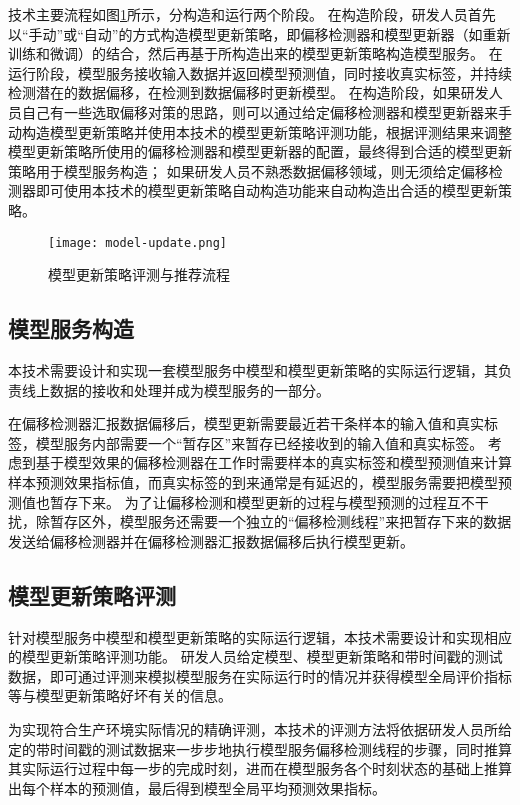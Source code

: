 技术主要流程如图\ref{fig:modelupdate}所示，分构造和运行两个阶段。
在构造阶段，研发人员首先以“手动”或“自动”的方式构造模型更新策略，即偏移检测器和模型更新器（如重新训练和微调）的结合，然后再基于所构造出来的模型更新策略构造模型服务。
在运行阶段，模型服务接收输入数据并返回模型预测值，同时接收真实标签，并持续检测潜在的数据偏移，在检测到数据偏移时更新模型。
在构造阶段，如果研发人员自己有一些选取偏移对策的思路，则可以通过给定偏移检测器和模型更新器来手动构造模型更新策略并使用本技术的模型更新策略评测功能，根据评测结果来调整模型更新策略所使用的偏移检测器和模型更新器的配置，最终得到合适的模型更新策略用于模型服务构造；
如果研发人员不熟悉数据偏移领域，则无须给定偏移检测器即可使用本技术的模型更新策略自动构造功能来自动构造出合适的模型更新策略。

\begin{figure}
  \centering
  \texttt{[image: model-update.png]}
  \caption{模型更新策略评测与推荐流程}
  \label{fig:modelupdate}
\end{figure}

\subsection{模型服务构造}

本技术需要设计和实现一套模型服务中模型和模型更新策略的实际运行逻辑，其负责线上数据的接收和处理并成为模型服务的一部分。

在偏移检测器汇报数据偏移后，模型更新需要最近若干条样本的输入值和真实标签，模型服务内部需要一个“暂存区”来暂存已经接收到的输入值和真实标签。
考虑到基于模型效果的偏移检测器在工作时需要样本的真实标签和模型预测值来计算样本预测效果指标值，而真实标签的到来通常是有延迟的，模型服务需要把模型预测值也暂存下来。
为了让偏移检测和模型更新的过程与模型预测的过程互不干扰，除暂存区外，模型服务还需要一个独立的“偏移检测线程”来把暂存下来的数据发送给偏移检测器并在偏移检测器汇报数据偏移后执行模型更新。

\subsection{模型更新策略评测}

针对模型服务中模型和模型更新策略的实际运行逻辑，本技术需要设计和实现相应的模型更新策略评测功能。
研发人员给定模型、模型更新策略和带时间戳的测试数据，即可通过评测来模拟模型服务在实际运行时的情况并获得模型全局评价指标等与模型更新策略好坏有关的信息。

为实现符合生产环境实际情况的精确评测，本技术的评测方法将依据研发人员所给定的带时间戳的测试数据来一步步地执行模型服务偏移检测线程的步骤，同时推算其实际运行过程中每一步的完成时刻，进而在模型服务各个时刻状态的基础上推算出每个样本的预测值，最后得到模型全局平均预测效果指标。

